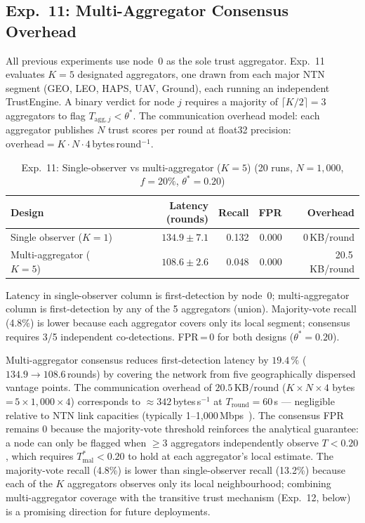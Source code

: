 \documentclass[journal,twoside,10pt]{IEEEtran}
\begin{document}
\subsection{Exp.~11: Multi-Aggregator Consensus Overhead}
\label{sec:exp11}

All previous experiments use node~0 as the sole trust aggregator.
Exp.~11 evaluates $K\!=\!5$ designated aggregators, one drawn from each
major NTN segment (GEO, LEO, HAPS, UAV, Ground), each running an
independent TrustEngine.
A binary verdict for node $j$ requires a majority of $\lceil K/2 \rceil\!=\!3$
aggregators to flag $T_{\mathrm{agg},j} < \theta^*$.
The communication overhead model: each aggregator publishes $N$ trust scores
per round at float32 precision:
$\mathrm{overhead} = K \cdot N \cdot 4$\,bytes\,round$^{-1}$.

\begin{table}[t]
\centering
\caption{Exp.~11: Single-observer vs multi-aggregator ($K\!=\!5$)
         (20 runs, $N\!=\!1{,}000$, $f\!=\!20\%$, $\theta^*\!=\!0.20$)}
\label{tab:exp11}
\renewcommand{\arraystretch}{1.1}
\small
\begin{tabular}{lrrrr}
\toprule
Design & Latency (rounds) & Recall & FPR & Overhead \\
\midrule
Single observer ($K\!=\!1$)    & $134.9\pm7.1$ & 0.132 & 0.000 & 0\,KB/round \\
Multi-aggregator ($K\!=\!5$)   & $108.6\pm2.6$ & 0.048 & 0.000 & 20.5\,KB/round \\
\bottomrule
\end{tabular}
{\footnotesize Latency in single-observer column is first-detection by node~0;
multi-aggregator column is first-detection by any of the 5 aggregators (union).
Majority-vote recall (4.8\%) is lower because each aggregator covers only its
local segment; consensus requires 3/5 independent co-detections.
FPR\,=\,0 for both designs ($\theta^*\!=\!0.20$).}
\end{table}

Multi-aggregator consensus reduces first-detection latency by
$19.4\,\%$ ($134.9 \rightarrow 108.6$\,rounds) by covering the network from
five geographically dispersed vantage points.
The communication overhead of $20.5$\,KB/round ($K\!\times\!N\!\times\!4$
bytes\,=\,$5\!\times\!1{,}000\!\times\!4$) corresponds to
$\approx\!342$\,bytes\,s$^{-1}$ at $T_{\mathrm{round}}\!=\!60$\,s
--- negligible relative to NTN link capacities (typically
1--1{,}000\,Mbps~\cite{3gpp38821}).
The consensus FPR remains 0 because the majority-vote threshold
reinforces the analytical guarantee: a node can only be flagged when
$\geq 3$ aggregators independently observe $T < 0.20$, which requires
$T^*_{\mathrm{mal}} < 0.20$ to hold at each aggregator's local estimate.
The majority-vote recall (4.8\%) is lower than single-observer recall
(13.2\%) because each of the $K$ aggregators observes only its local
neighbourhood; combining multi-aggregator coverage with the transitive
trust mechanism (Exp.~12, below) is a promising direction for
future deployments.
\end{document}
